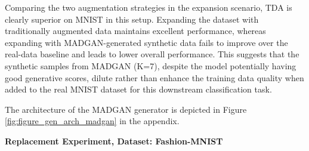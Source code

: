 Comparing the two augmentation strategies in the expansion scenario, TDA is clearly superior on MNIST in this setup. Expanding the dataset with traditionally augmented data maintains excellent performance, whereas expanding with MADGAN-generated synthetic data fails to improve over the real-data baseline and leads to lower overall performance. This suggests that the synthetic samples from MADGAN (K=7), despite the model potentially having good generative scores, dilute rather than enhance the training data quality when added to the real MNIST dataset for this downstream classification task.


The architecture of the MADGAN generator is depicted in Figure \ref{fig:figure_gen_arch_madgan} in the appendix.

\newpage
\noindent\textbf{Replacement Experiment, Dataset: Fashion-MNIST}
